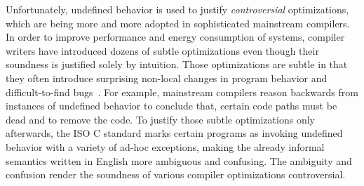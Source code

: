 Unfortunately, undefined behavior is used to justify \emph{controversial} optimizations, which are
being more and more adopted in sophisticated mainstream compilers.  In order to improve performance
and energy consumption of systems, compiler writers have introduced dozens of subtle optimizations
even though their soundness is justified solely by intuition.  Those optimizations are subtle in
that they often introduce surprising non-local changes in program behavior and difficult-to-find
bugs~\cite{wang2013towards,yang2011finding}.  For example, mainstream compilers reason backwards
from instances of undefined behavior to conclude that, \eg{} certain code paths must be dead and to
remove the code.  To justify those subtle optimizations only afterwards, the ISO C standard marks
certain programs as invoking undefined behavior with a variety of ad-hoc exceptions, making the
already informal semantics written in English more ambiguous and confusing.  The ambiguity and
confusion render the soundness of various compiler optimizations controversial.






